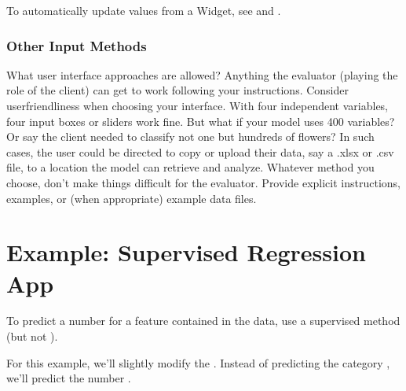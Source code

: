 \documentclass[letterpaper,10pt,english]{jupyterBook}
\begin{document}
\sphinxAtStartPar
To automatically update values from a Widget, see  and .


\subsubsection{Other Input Methods}
\label{\detokenize{task2_c/example_sup_class/sup_class_ex-ui:other-input-methods}}
\sphinxAtStartPar
What user interface approaches are allowed? Anything the evaluator (playing the role of the client) can get to work following your instructions. Consider user\sphinxhyphen{}friendliness when choosing your interface. With four independent variables, four input boxes or sliders work fine. But what if your model uses 400 variables? Or say the client needed to classify not one but hundreds of flowers? In such cases, the user could be directed to copy or upload their data, say a .xlsx or .csv file, to a location the model can retrieve and analyze. Whatever method you choose, don’t make things difficult for the evaluator. Provide explicit instructions, examples, or (when appropriate) example data files.

\sphinxstepscope


\section{Example: Supervised Regression App}
\label{\detokenize{task2_c/example_sup_reg/sup_reg_ex:example-supervised-regression-app}}\label{\detokenize{task2_c/example_sup_reg/sup_reg_ex:sup-reg-ex}}\label{\detokenize{task2_c/example_sup_reg/sup_reg_ex::doc}}
\sphinxAtStartPar
To predict a number for a feature contained in the data, use a supervised  method (but not {\hyperref[\detokenize{task1:task1-choosing-topic-logistic}]{}}).

\sphinxAtStartPar
For this example, we’ll slightly modify the {\hyperref[\detokenize{task2_c/example_sup_class/sup_class_ex:sup-class-ex}]{}}. Instead of predicting the category , we’ll predict the number .
\end{document}
